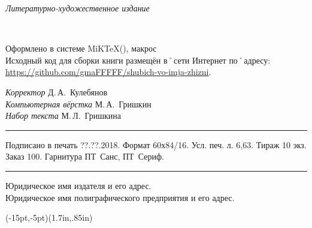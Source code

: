 ﻿\clearpage

\thispagestyle{empty}
\noindent\begin{center}
	{\itshape Литературно-художественное издание\par}
\end{center}	
\vfill\noindent
\begin{center}
	{\large{\bfseries\MakeUppercase{\AuthorFam}} \AuthorName\\[3ex]}	
	{\LARGE\Title}
\end{center}

\vfill\noindent
\begin{center}
	Оформлено в системе MiK\TeX(\LaTeXe), макрос \KOMAScript\\[1ex]
	Исходный код для сборки книги размещён в˚сети Интернет по˚адресу: \url{https://github.com/gmaFFFFF/shubich-vo-imja-zhizni}.
\end{center}
	
\vfill\noindent
\begin{center}
	\small 
	{\itshape Корректор} Д.\,А.~Кулебянов\\[1ex]
	{\itshape Компьютерная вёрстка} М.\,А.~Гришкин\\[1ex]
	{\itshape Набор текста} М.\,Л.~Гришкина\\[1ex]
\end{center}

\vfill\noindent
\rule{\textwidth}{.5pt}
\begin{center}
	\small Подписано в печать  ??.??.2018. Формат 60х84/16. Усл. печ. л. 6,63. Тираж 10 экз. Заказ 100. Гарнитура ПТ~Санс, ПТ~Сериф.		
\end{center}
\rule{\textwidth}{.5pt}

\vfil\noindent		
\begin{center}
		\small
		
		Юридическое имя издателя и его адрес.\\[1ex]
				
		Юридическое имя полиграфического предприятия и его адрес.
\end{center}

\vfil
\noindent\begin{center}
	\begin{pspicture}(-15pt,-5pt)(1.7in,.85in)
	\end{pspicture}
\end{center}	

\clearpage
\thispagestyle{empty}
\label{myLastPage}
\null
\clearpage